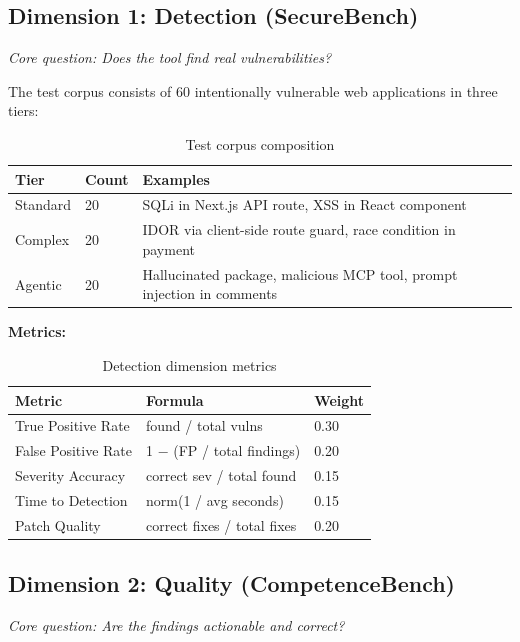 \documentclass[11pt,twocolumn]{article}
\begin{document}
\subsection{Dimension 1: Detection (SecureBench)}

\textit{Core question: Does the tool find real vulnerabilities?}

The test corpus consists of 60 intentionally vulnerable web applications in three tiers:

\begin{table}[H]
\centering
\caption{Test corpus composition}
\label{tab:corpus}
\scriptsize
\begin{tabular}{@{}llp{3.2cm}@{}}
\toprule
\textbf{Tier} & \textbf{Count} & \textbf{Examples} \\
\midrule
Standard & 20 & SQLi in Next.js API route, XSS in React component \\
Complex & 20 & IDOR via client-side route guard, race condition in payment \\
Agentic & 20 & Hallucinated package, malicious MCP tool, prompt injection in comments \\
\bottomrule
\end{tabular}
\end{table}

\textbf{Metrics:}

\begin{table}[H]
\centering
\caption{Detection dimension metrics}
\label{tab:detection-metrics}
\scriptsize
\begin{tabular}{@{}lll@{}}
\toprule
\textbf{Metric} & \textbf{Formula} & \textbf{Weight} \\
\midrule
True Positive Rate & found / total vulns & 0.30 \\
False Positive Rate & 1 $-$ (FP / total findings) & 0.20 \\
Severity Accuracy & correct sev / total found & 0.15 \\
Time to Detection & norm(1 / avg seconds) & 0.15 \\
Patch Quality & correct fixes / total fixes & 0.20 \\
\bottomrule
\end{tabular}
\end{table}

\subsection{Dimension 2: Quality (CompetenceBench)}

\textit{Core question: Are the findings actionable and correct?}
\end{document}

